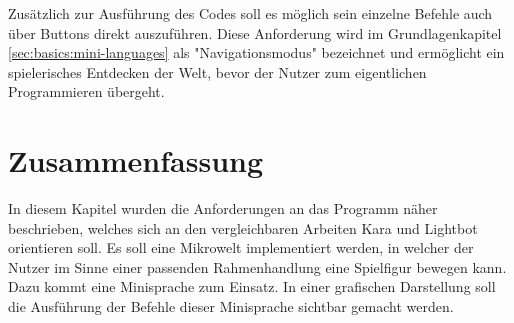 Zusätzlich zur Ausführung des Codes soll es möglich sein einzelne Befehle auch über Buttons direkt auszuführen. Diese Anforderung wird im Grundlagenkapitel \ref{sec:basics:mini-languages} als "Navigationsmodus" bezeichnet und ermöglicht ein spielerisches Entdecken der Welt, bevor der Nutzer zum eigentlichen Programmieren übergeht.

\section{Zusammenfassung}
\label{sec:requirements:summary}

In diesem Kapitel wurden die Anforderungen an das Programm näher beschrieben, welches sich an den vergleichbaren Arbeiten Kara und Lightbot orientieren soll. Es soll eine Mikrowelt implementiert werden, in welcher der Nutzer im Sinne einer passenden Rahmenhandlung eine Spielfigur bewegen kann. Dazu kommt eine Minisprache zum Einsatz. In einer grafischen Darstellung soll die Ausführung der Befehle dieser Minisprache sichtbar gemacht werden.
